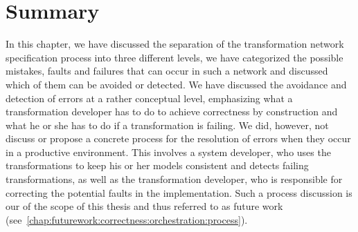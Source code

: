\section{Summary}

In this chapter, we have discussed the separation of the transformation network specification process into three different levels, we have categorized the possible mistakes, faults and failures that can occur in such a network and discussed which of them can be avoided or detected.
We have discussed the avoidance and detection of errors at a rather conceptual level, emphasizing what a transformation developer has to do to achieve correctness by construction and what he or she has to do if a transformation is failing.
We did, however, not discuss or propose a concrete process for the resolution of errors when they occur in a productive environment.
This involves a system developer, who uses the transformations to keep his or her models consistent and detects failing transformations, as well as the transformation developer, who is responsible for correcting the potential faults in the implementation.
Such a process discussion is our of the scope of this thesis and thus referred to as future work (see~\autoref{chap:futurework:correctness:orchestration:process}).



